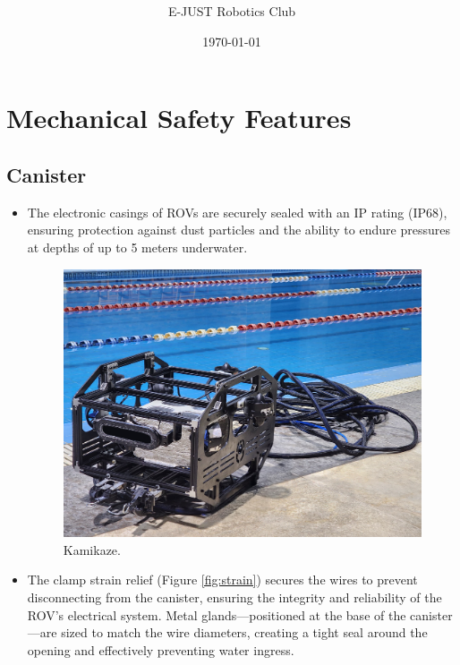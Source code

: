 \documentclass[11pt, twocolumn]{article}
\title{\Huge \color{mypink3}{ROV Document}  \vspace{0.5cm}}
\author{\Large E-JUST Robotics Club \normalsize \hspace{0.5cm} }
\date{\today}
\begin{document}
\onecolumn

\tableofcontents
\clearpage

\twocolumn

\section{Mechanical Safety Features}

\subsection{Canister}

\begin{itemize}[leftmargin=0pt, itemindent=10pt]
    \setlength{\itemsep}{0pt}
    \item The electronic casings of ROVs are securely sealed with an IP rating (IP68), ensuring protection against dust particles and the ability to endure pressures at depths of up to 5 meters underwater.
    
    \begin{figure}[h!]
        \centering
        \includegraphics[width=\columnwidth]{Images/kamikaze.jpeg}
        \caption{Kamikaze.}
        \label{fig:kamikaze}
    \end{figure}

    \item The clamp strain relief (Figure \ref{fig:strain}) secures the wires to prevent disconnecting from the canister, ensuring the integrity and reliability of the ROV’s electrical system. Metal glands—positioned at the base of the canister—are sized to match the wire diameters, creating a tight seal around the opening and effectively preventing water ingress.
    

\end{itemize}
\end{document}
